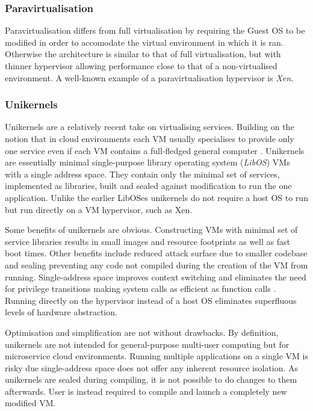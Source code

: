 \subsubsection{Paravirtualisation}

Paravirtualisation differs from full virtualisation by requiring the Guest OS to be modified in order to accomodate the virtual environment in which it is ran. Otherwise the architecture is similar to that of full virtualisation, but with thinner hypervisor allowing performance close to that of a non-virtualised environment. A well-known example of a paravirtualisation hypervisor is \textit{Xen}\cite{xen}.

\subsubsection{Unikernels}

Unikernels are a relatively recent take on virtualising services. Building on the notion that in cloud environments each VM usually specialises to provide only one service even if each VM contains a full-fledged general computer \cite{unikernels}. Unikernels are essentially minimal single-purpose library operating system (\textit{LibOS})\cite{libos} VMs with a single address space. They contain only the minimal set of services, implemented as libraries, built and sealed against modification to run the one application. Unlike the earlier LibOSes unikernels do not require a host OS to run but run directly on a VM hypervisor, such as Xen.

Some benefits of unikernels are obvious. Constructing VMs with minimal set of service libraries results in small images and resource footprints as well as fast boot times. Other benefits include reduced attack surface due to smaller codebase and sealing preventing any code not compiled during the creation of the VM from running. Single-address space improves context switching and eliminates the need for privilege transitions making system calls as efficient as function calls \cite{osv}. Running directly on the hypervisor instead of a host OS eliminates superfluous levels of hardware abstraction.

Optimisation and simplification are not without drawbacks. By definition, unikernels are not intended for general-purpose multi-user computing but for microservice cloud environments. Running multiple applications on a single VM is risky due single-address space does not offer any inherent resource isolation. As unikernels are sealed during compiling, it is not possible to do changes to them afterwards. User is instead required to compile and launch a completely new modified VM.

